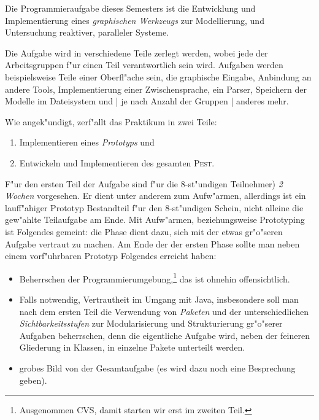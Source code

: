 \documentclass[11pt]{article}
\begin{document}


\thispagestyle{empty}

\noindent%
Die Programmieraufgabe dieses Semesters ist die Entwicklung und
Implementierung eines \emph{graphischen Werkzeugs} zur Modellierung, und
Untersuchung reaktiver, paralleler Systeme. 

Die Aufgabe wird in verschiedene Teile zerlegt werden, wobei jede der
Arbeitsgruppen f"ur einen Teil verantwortlich sein wird. Aufgaben werden
beispielsweise Teile einer Oberfl"ache sein, die graphische Eingabe,
Anbindung an andere Tools, Implementierung einer Zwischensprache, ein
Parser, Speichern der Modelle im Dateisystem und | je nach Anzahl der
Gruppen | anderes mehr.

Wie angek"undigt, zerf"allt das Praktikum in zwei Teile:
\begin{enumerate}
\item Implementieren eines \emph{Prototyps} und
\item Entwickeln und Implementieren des gesamten \textsc{Pest}.
\end{enumerate}



F"ur den ersten Teil der Aufgabe sind f"ur die 8-st"undigen Teilnehmer)
\emph{2 Wochen} vorgesehen.  Er dient unter anderem zum Aufw"armen,
allerdings ist ein lauff"ahiger Prototyp Bestandteil f"ur den 8-st"undigen
Schein, nicht alleine die gew"ahlte Teilaufgabe am Ende. Mit Aufw"armen,
beziehungsweise Prototyping ist Folgendes gemeint: die Phase dient dazu,
sich mit der etwas gr"o"seren Aufgabe vertraut zu machen. Am Ende der der
ersten Phase sollte man neben einem vorf"uhrbaren Prototyp Folgendes
erreicht haben:
\begin{itemize}
\item Beherrschen der Programmierumgebung,\footnote{Ausgenommen CVS, damit
    starten wir erst im zweiten Teil.} das ist ohnehin offensichtlich.
\item Falls notwendig, Vertrautheit im Umgang mit Java, insbesondere soll
  man nach dem ersten Teil die Verwendung von \emph{Paketen} und der
  unterschiedlichen \emph{Sichtbarkeitsstufen} zur Modularisierung und
  Strukturierung gr"o"serer Aufgaben beherrschen, denn die eigentliche
  Aufgabe wird, neben der feineren Gliederung in Klassen, in einzelne
  Pakete unterteilt werden.
\item grobes Bild von der Gesamtaufgabe (es wird dazu noch eine Besprechung
  geben).
\end{itemize}
\end{document}

